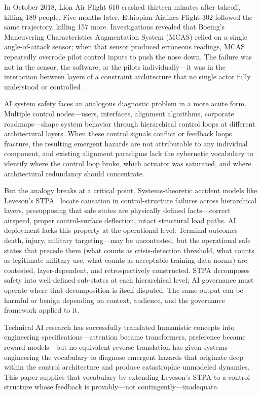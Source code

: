 \documentclass[11pt]{article}
\begin{document}
In October 2018, Lion Air Flight 610 crashed thirteen minutes after takeoff, killing 189 people. Five months later, Ethiopian Airlines Flight 302 followed the same trajectory, killing 157 more. Investigations revealed that Boeing's Maneuvering Characteristics Augmentation System (MCAS) relied on a single angle-of-attack sensor; when that sensor produced erroneous readings, MCAS repeatedly overrode pilot control inputs to push the nose down. The failure was not in the sensor, the software, or the pilots individually---it was in the interaction between layers of a constraint architecture that no single actor fully understood or controlled~\cite{jatr2019737max}.

AI system safety faces an analogous diagnostic problem in a more acute form. Multiple control nodes---users, interfaces, alignment algorithms, corporate roadmaps---shape system behavior through hierarchical control loops at different architectural layers. When these control signals conflict or feedback loops fracture, the resulting emergent hazards are not attributable to any individual component, and existing alignment paradigms lack the cybernetic vocabulary to identify where the control loop broke, which actuator was saturated, and where architectural redundancy should concentrate.

But the analogy breaks at a critical point. Systems-theoretic accident models like Leveson's STPA~\cite{leveson2012engineering, leveson2018stpa} locate causation in control-structure failures across hierarchical layers, presupposing that safe states are physically defined facts---correct airspeed, proper control-surface deflection, intact structural load paths. AI deployment lacks this property at the operational level. Terminal outcomes---death, injury, military targeting---may be uncontested, but the operational safe states that precede them (what counts as crisis-detection threshold, what counts as legitimate military use, what counts as acceptable training-data norms) are contested, layer-dependent, and retrospectively constructed. STPA decomposes safety into well-defined sub-states at each hierarchical level; AI governance must operate where that decomposition is itself disputed. The same output can be harmful or benign depending on context, audience, and the governance framework applied to it.

Technical AI research has successfully translated humanistic concepts into engineering specifications---attention became transformers, preference became reward models---but no equivalent reverse translation has given systems engineering the vocabulary to diagnose emergent hazards that originate deep within the control architecture and produce catastrophic unmodeled dynamics. This paper supplies that vocabulary by extending Leveson's STPA to a control structure whose feedback is provably---not contingently---inadequate.
\end{document}
